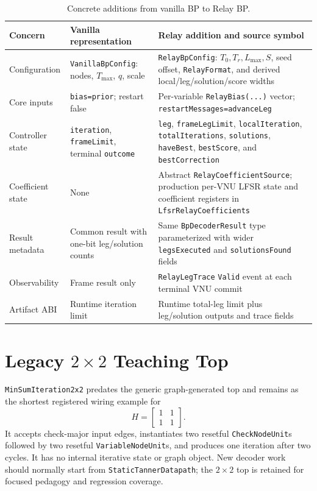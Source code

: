 \documentclass[10pt,conference]{IEEEtran}
\begin{document}
\begin{table}[t]
\caption{Concrete additions from vanilla BP to Relay BP.}
\label{tab:relay-delta}
\centering
\scriptsize
\begin{tabular}{@{}p{}p{}p{}@{}}
\toprule
Concern & Vanilla representation & Relay addition and source symbol \\
\midrule
Configuration & \texttt{VanillaBpConfig}: nodes, $T_{\max}$, $q$, scale & \texttt{RelayBpConfig}: $T_0,T_r,L_{\max},S$, seed offset, \texttt{RelayFormat}, and derived local/leg/solution/score widths \\
Core inputs & \texttt{bias=prior}; restart false & Per-variable \texttt{RelayBias(...)} vector; \texttt{restartMessages=advanceLeg} \\
Controller state & \texttt{iteration}, \texttt{frameLimit}, terminal \texttt{outcome} & \texttt{leg}, \texttt{frameLegLimit}, \texttt{localIteration}, \texttt{totalIterations}, \texttt{solutions}, \texttt{haveBest}, \texttt{bestScore}, and \texttt{bestCorrection} \\
Coefficient state & None & Abstract \texttt{RelayCoefficientSource}; production per-VNU LFSR state and coefficient registers in \texttt{LfsrRelayCoefficients} \\
Result metadata & Common result with one-bit leg/solution counts & Same \texttt{BpDecoderResult} type parameterized with wider \texttt{legsExecuted} and \texttt{solutionsFound} fields \\
Observability & Frame result only & \texttt{RelayLegTrace} \texttt{Valid} event at each terminal VNU commit \\
Artifact ABI & Runtime iteration limit & Runtime total-leg limit plus leg/solution outputs and trace fields \\
\bottomrule
\end{tabular}
\end{table}

\section{Legacy \texorpdfstring{$2\times2$}{2 x 2} Teaching Top}
\texttt{MinSumIteration2x2} predates the generic graph-generated top and remains
as the shortest registered wiring example for
\begin{equation}
 H=\begin{bmatrix}1&1\\1&1\end{bmatrix}.
\end{equation}
It accepts check-major input edges, instantiates two resetful
\texttt{CheckNodeUnit}s followed by two resetful \texttt{VariableNodeUnit}s,
and produces one iteration after two cycles.  It has no internal iterative
state or graph object.  New decoder work should normally start from
\texttt{StaticTannerDatapath}; the $2\times2$ top is retained for focused
pedagogy and regression coverage.
\end{document}
